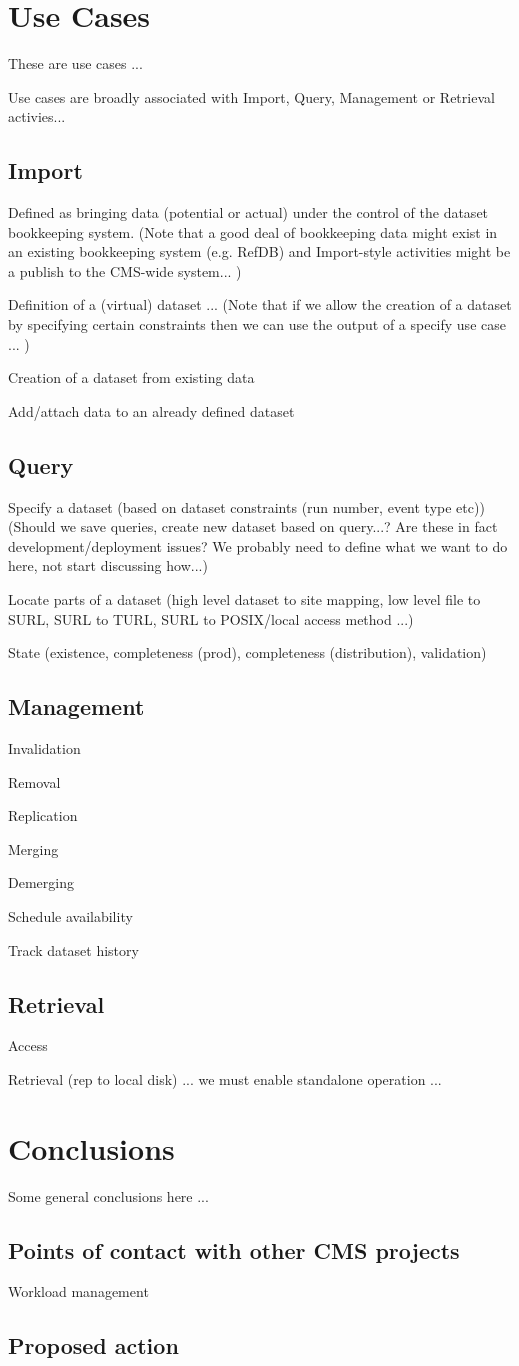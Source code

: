 \documentclass{article}
\begin{document}
\section{Use Cases}
These are use cases ... 

Use cases are broadly associated with Import, Query, Management or Retrieval activies...

\subsection{Import}
Defined as bringing data (potential or actual) under the control of the dataset bookkeeping system. (Note  that a good deal of bookkeeping data might exist in an existing bookkeeping system (e.g. RefDB) and Import-style activities might be a publish to the CMS-wide system... )

Definition of a (virtual) dataset ... (Note that if we allow the creation of a dataset by specifying certain constraints then we can use the output of a specify use case ... )

Creation of a dataset from existing data

Add/attach data to an already defined dataset

\subsection{Query}
Specify a dataset (based on dataset constraints (run number, event type etc)) (Should we save queries, create new dataset based on query...? Are these in fact development/deployment issues? We probably need to define what we want to do here, not start discussing how...) 

Locate parts of a dataset (high level dataset to site mapping, low level file to  SURL, SURL to TURL, SURL to POSIX/local access method ...)

State (existence, completeness (prod), completeness (distribution), validation)

\subsection{Management}
Invalidation
 
Removal

Replication

Merging

Demerging

Schedule availability

Track dataset history

\subsection{Retrieval}
Access

Retrieval (rep to local disk) ... we must enable standalone operation ...


\section{Conclusions}
Some general conclusions here ...

\subsection{Points of contact with other CMS projects}
Workload management

\subsection{Proposed action}
\end{document}
